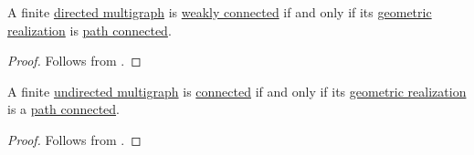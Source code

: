 \begin{corollary}\label{thm:directed_multigraph_geometric_realization_connectedness}
  A finite \hyperref[def:directed_multigraph]{directed multigraph} is \hyperref[def:graph_connectedness/weak]{weakly connected} if and only if its \hyperref[def:graph_geometric_realization/undirected]{geometric realization} is \hyperref[def:path_connected_space]{path connected}.
\end{corollary}
\begin{proof}
  Follows from .
\end{proof}

\begin{corollary}\label{thm:undirected_multigraph_geometric_realization_connectedness}
  A finite \hyperref[def:undirected_multigraph]{undirected multigraph} is \hyperref[def:graph_connectedness/undirected]{connected} if and only if its \hyperref[def:graph_geometric_realization/undirected]{geometric realization} is a \hyperref[def:path_connected_space]{path connected}.
\end{corollary}
\begin{proof}
  Follows from .
\end{proof}
